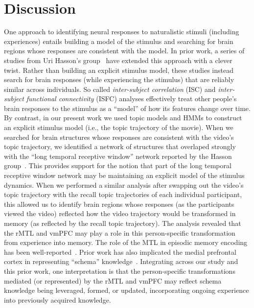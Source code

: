 \documentclass{article}
\begin{document}
\section*{Discussion}
\label{sec:discussion}

One approach to identifying neural responses to naturalistic stimuli (including experiences) entails building a model of the stimulus and searching for brain regions whose responses are consistent with the model.  In prior work, a series of studies from Uri Hasson's group~\citep{LernEtal11, SimoEtal16, ChenEtal17, BaldEtal17, ZadbEtal17} have extended this approach with a clever twist.  Rather than building an explicit stimulus model, these studies instead search for brain responses (while experiencing the stimulus) that are reliably similar across individuals.  So called \textit{inter-subject correlation} (ISC) and \textit{inter-subject functional connectivity} (ISFC) analyses effectively treat other people's brain responses to the stimulus as a ``model'' of how its features change over time.  By contrast, in our present work we used topic models and HMMs to construct an explicit stimulus model (i.e., the topic trajectory of the movie).  When we searched for brain structures whose responses are consistent with the video's topic trajectory, we identified a network of structures that overlaped strongly with the ``long temporal receptive window'' network reported by the Hasson group~\citep[e.g., compare our Fig.~\ref{fig:brainz}A with the map of long temporal receptive window voxels in][]{LernEtal11}.  This provides support for the notion that part of the long temporal receptive window network may be maintaining an explicit model of the stimulus dynamics.  When we performed a similar analysis after swapping out the video's topic trajectory with the recall topic trajectories of each individual participant, this allowed us to identify brain regions whose responses (as the participants viewed the video) reflected how the video trajectory would be transformed in memory (as reflected by the recall topic trajectory).  The analysis revealed that the rMTL and vmPFC may play a role in this person-specific transformation from experience into memory.  The role of the MTL in episodic memory encoding has been well-reported~\citep[e.g., ][]{PallWagn02, DavaEtAl03, RangEtal04, Dava06}.  Prior work has also implicated the medial prefrontal cortex in representing ``schema'' knowledge~\citep[i.e., general knowledge about the format of an ongoing experience given prior similar experiencs; ][]{KestEtal12, GilbMarl17}.  Integrating across our study and this prior work, one interpretation is that the person-specific transformations mediated (or represented) by the rMTL and vmPFC may reflect schema knowledge being leveraged, formed, or updated, incorporating ongoing experience into previously acquired knowledge.
\end{document}
